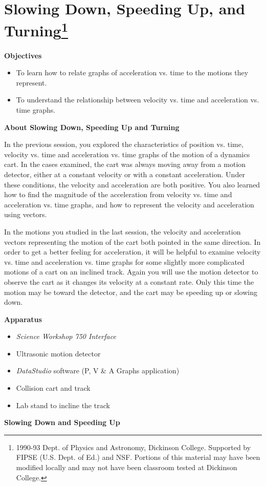 
\section{Slowing Down, Speeding Up, and Turning\footnote{
1990-93 Dept. of Physics and Astronomy, Dickinson College. Supported by FIPSE
(U.S. Dept. of Ed.) and NSF. Portions of this material may have been modified
locally and may not have been classroom tested at Dickinson College.
}}

\makelabheader %

\textbf{Objectives }

\begin{itemize}
\item To learn how to relate graphs of acceleration vs. time to the motions they represent. 
\item To understand the relationship between velocity vs. time and acceleration vs.
time graphs.
\end{itemize}
\textbf{About Slowing Down, Speeding Up and Turning }

In the previous session, you explored the characteristics of position vs. time,
velocity vs. time and acceleration vs. time graphs of the motion of a dynamics
cart. In the cases examined, the cart was always moving away from a motion detector,
either at a constant velocity or with a constant acceleration. Under these conditions,
the velocity and acceleration are both positive. You also learned how to find
the magnitude of the acceleration from velocity vs. time and acceleration vs.
time graphs, and how to represent the velocity and acceleration using vectors. 

In the motions you studied in the last session, the velocity and acceleration
vectors representing the motion of the cart both pointed in the same direction.
In order to get a better feeling for acceleration, it will be helpful to examine
velocity vs. time and acceleration vs. time graphs for some slightly more complicated
motions of a cart on an inclined track. Again you will use the motion detector
to observe the cart as it changes its velocity at a constant rate. Only this
time the motion may be toward the detector, and the cart may be speeding up
or slowing down.

\textbf{Apparatus }

\begin{itemize}
\item \textit{Science Workshop 750 Interface}
\item Ultrasonic motion detector 
\item \textit{DataStudio} software (P, V \& A Graphs application)
\item Collision cart and track 
\item Lab stand to incline the track
\end{itemize}
\textbf{Slowing Down and Speeding Up }


